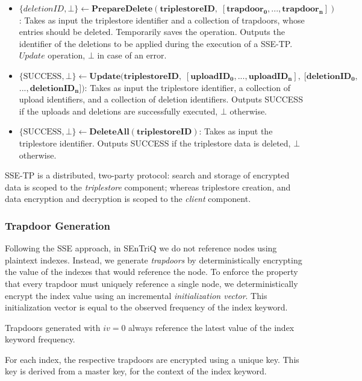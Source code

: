 \begin{definition}
\begin{itemize}
        \item $\{deletionID, \bot\} \leftarrow \mathbf{PrepareDelete(triplestoreID, \; [trapdoor_0, ..., trapdoor_n])}$: Takes as input the triplestore identifier and a collection of trapdoors, whose entries should be deleted. Temporarily saves the operation. Outputs the identifier of the deletions to be applied during the execution of a SSE-TP.$Update$ operation, $\bot$ in case of an error.
        \item $\{\textrm{SUCCESS}, \bot\} \leftarrow \mathbf{Update(triplestoreID, \; [uploadID_0, ..., uploadID_n], \; [deletionID_0,}$ \linebreak $\mathbf{ ..., deletionID_n])}$: Takes as input the triplestore identifier, a collection of upload identifiers, and a collection of deletion identifiers. Outputs SUCCESS if the uploads and deletions are successfully executed, $\bot$ otherwise.
        \item $\{\textrm{SUCCESS}, \bot\} \leftarrow \mathbf{DeleteAll(triplestoreID)}$: Takes as input the triplestore identifier. Outputs SUCCESS if the triplestore data is deleted, $\bot$ otherwise.
    \end{itemize}
    SSE-TP is a distributed, two-party protocol: search and storage of encrypted data is scoped to the \emph{triplestore} component; whereas triplestore creation, and data encryption and decryption is scoped to the \emph{client} component.
\end{definition}

\subsubsection{Trapdoor Generation}

Following the \gls{SSE} approach, in \gls{SEnTriQ} we do not reference nodes using plaintext indexes. Instead, we generate \emph{trapdoors} by deterministically encrypting the value of the indexes that would reference the node. To enforce the property that every trapdoor must uniquely reference a single node, we deterministically encrypt the index value using an incremental \emph{initialization vector}. This initialization vector is equal to the observed frequency of the index keyword.

Trapdoors generated with $iv = 0$ always reference the latest value of the index keyword frequency.

For each index, the respective trapdoors are encrypted using a unique key. This key is derived from a master key, for the context of the index keyword.

